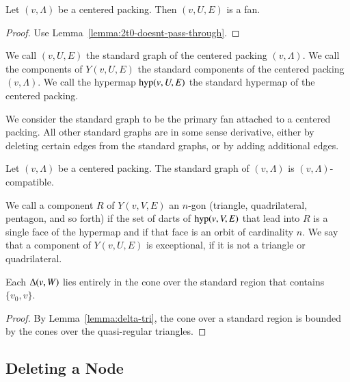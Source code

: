 \begin{lemma}
Let $(v,\Lambda)$ be a centered packing.  Then
$(v,U,E)$ is a fan.
\end{lemma}

\begin{proof}
Use Lemma~\ref{lemma:2t0-doesnt-pass-through}.
\end{proof}

\begin{definition}  We call $(v,U,E)$ the standard
graph of the centered packing $(v,\Lambda)$.   We call the
components of $Y(v,U,E)$ the standard components of the centered
packing $(v,\Lambda)$.  We call the hypermap ${\operatorname{hyp}}(v,U,E)$
the standard hypermap of the centered packing.  
\end{definition}

We consider the standard graph  to be the
primary fan attached to a centered packing.  All other
standard graphs are in some sense derivative, either by deleting
certain edges from the standard graphs, or by adding additional
edges.


\begin{lemma}
Let $(v,\Lambda)$ be a centered packing.  The standard graph
of $(v,\Lambda)$ is $(v,\Lambda)$-compatible.
\end{lemma}

\begin{definition}  We call a component $R$ of $Y(v,V,E)$ an
$n$-gon (triangle, quadrilateral, pentagon, and so forth) if
the set of darts of ${\operatorname{hyp}}(v,V,E)$ that lead into $R$ is
a single face of the hypermap and if that face is an orbit of
cardinality $n$.   We say that
a component of $Y(v,U,E)$ is exceptional, if it is not a
triangle or quadrilateral.
\end{definition}


\begin{lemma}
Each $\Delta(v,W)$ lies entirely in the cone over the standard
region that contains $\{v_0,v\}$.
\end{lemma}

\begin{proof}
By Lemma~\ref{lemma:delta-tri},
the cone over a standard region is bounded by the cones  over the
quasi-regular triangles.
\end{proof}

\subsection{Deleting a Node}

